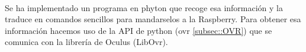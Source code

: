 \documentclass[twoside, 11pt]{epstfg}
\begin{document}
\begin{figure}[H]
	\centering
	 \\
	
	\caption{}
	\label{OculusDk2} 
\end{figure}



 
Se ha implementado un programa en phyton que recoge esa información y la traduce en comandos sencillos para mandarselos a la Raspberry. Para obtener esa información hacemos uso de la API de python (ovr \ref{subsec::OVR}) que se comunica con la librería de Oculus (LibOvr).
\end{document}
